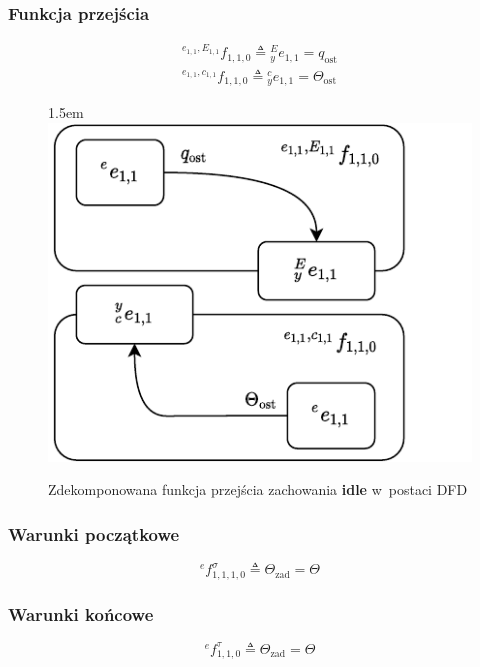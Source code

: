\subsubsection{Funkcja przejścia}
\begin{equation}
    \begin{gathered}
        {}^{e_{1,1}, E_{1,1}}f_{1,1,0} \triangleq {}^{E}_{y}e_{1,1} = q_{\mathrm{ost}}\\
        {}^{e_{1,1}, c_{1,1}}f_{1,1,0} \triangleq {}^{c}_{y}e_{1,1} = \Theta_{\mathrm{ost}}
    \end{gathered}
\end{equation}

\begin{figure}[ht]
    \leftskip1.5em
    \includegraphics[width=\columnwidth]{figures/ISR-ve-manip-fp-idle.pdf}
    \label{fig:ve-manip-fp-idle}
    \caption{Zdekomponowana funkcja przejścia zachowania \textbf{idle} w~postaci DFD}
\end{figure}

\subsubsection{Warunki początkowe}
\begin{equation}
    {}^{e}f^{\sigma}_{1,1,1,0} \triangleq \Theta_{\mathrm{zad}} = \Theta
\end{equation}

\subsubsection{Warunki końcowe}
\begin{equation}
    {}^{e}f^{\tau}_{1,1,0} \triangleq \Theta_{\mathrm{zad}} = \Theta
\end{equation}

